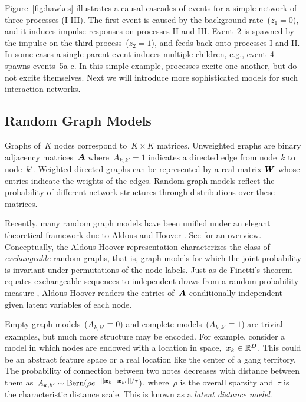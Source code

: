 Figure~\ref{fig:hawkes} illustrates a causal cascades of events for a simple network of three processes (I-III).  The first event is caused by the background rate~(${z_1=0}$), and it induces impulse responses on processes II and III. Event~2 is spawned by the impulse on the third process~(${z_2=1}$), and feeds back onto processes I and II. In some cases a single parent event induces multiple children, e.g., event~4 spawns events~{5a-c}. In this simple example, processes excite one another, but do not excite themselves. Next we will introduce more sophisticated models for such interaction networks.  

\subsection{Random Graph Models}
\label{sec:graph_models}
Graphs of~$K$ nodes correspond to~${K\times K}$ matrices. Unweighted graphs are binary adjacency matrices~$\boldsymbol{A}$ where~${A_{k,k'}=1}$ indicates a directed edge from node~$k$ to node~$k'$. Weighted directed graphs can be represented by a real matrix $\boldsymbol{W}$ whose entries indicate the weights of the edges. Random graph models reflect the probability of different network structures through distributions over these matrices.

Recently, many random graph models have been unified under an elegant theoretical framework due to Aldous and Hoover \cite{Aldous-1981,Hoover-1979}. See \citet{Lloyd-2012} for an overview. Conceptually, the Aldous-Hoover representation characterizes the class of \textit{exchangeable} random graphs, that is, graph models for which the joint probability is invariant under permutations of the node labels. Just as de Finetti's theorem equates exchangeable sequences to independent draws from a random probability measure
, Aldous-Hoover renders the entries of~$\boldsymbol{A}$ conditionally independent given latent variables of each node. 

Empty graph models~(${A_{k,k'}\equiv 0}$) and complete models~(${A_{k,k'}\equiv 1}$) are trivial examples, but much more structure may be encoded. For example, consider a model in which nodes are endowed with a location in space,~${\boldsymbol{x}_k\in\mathbb{R}^D}$. This could be an abstract feature space or a real location like the center of a gang territory. The probability of connection between two notes decreases with distance between them as~${A_{k,k'}\sim\text{Bern}(\rho e^{-||\boldsymbol{x}_k-\boldsymbol{x}_{k'}||/\tau})}$, where~$\rho$ is the overall sparsity and~$\tau$ is the characteristic distance scale.
This is known as a \emph{latent distance model}.

